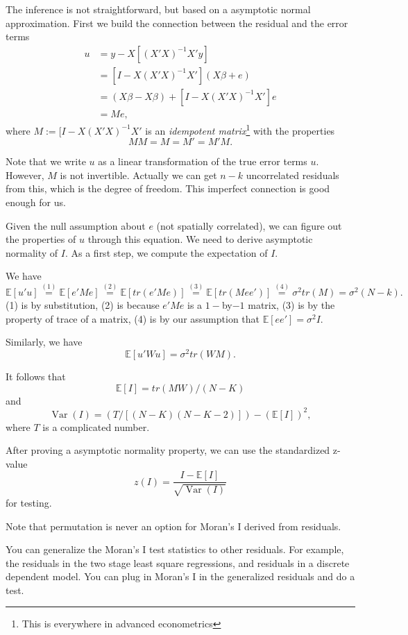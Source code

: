 \documentclass[11pt,a4paper]{amsart}
\theoremstyle{plain}
\theoremstyle{definition}
\begin{document}
The inference is not straightforward, but based on a asymptotic normal approximation. First we build the connection between the residual and the error terms
\[	\begin{aligned}
	u &= y - X[(X'X)^{-1}X'y] \\
	&= [I - X(X'X)^{-1}X'](X\beta + e)\\
	&= (X\beta - X\beta) + [I - X(X'X)^{-1}X']e\\
	&= Me,
 \end{aligned}	\]
where $M := [I - X(X'X)^{-1}X'$ is an \textit{idempotent matrix}\footnote{This is everywhere in advanced econometrics} with the properties 
\[MM = M = M' = M'M. \]

Note that we write $u$ as a linear transformation of the true error terms $u$. However, $M$ is not invertible. Actually we can get $n-k$ uncorrelated residuals from this, which is the degree of freedom. This imperfect connection is good enough for us. 

Given the null assumption about $e$ (not spatially correlated), we can figure out the properties of $u$ through this equation. We need to derive asymptotic normality of $I$. As a first step, we compute the expectation of $I$.

We have 
\[	\mathbb{E}[u'u]  \stackrel{(1)}{=} \mathbb{E}[e'Me] \stackrel{(2)}{=} \mathbb{E}[tr(e'Me)]  \stackrel{(3)}{=} \mathbb{E}[tr(Mee')]  \stackrel{(4)}{=} \sigma^{2}tr(M)  = \sigma^{2}(N-k).	\]
(1) is by substitution, (2) is because $e'Me$ is a $1-$by$-1$ matrix, (3) is by the property of trace of a matrix, (4) is by our assumption that $\mathbb{E}[ee'] = \sigma^{2}I$.

Similarly, we have 
\[	\mathbb{E}[u'Wu] = \sigma^{2} tr(WM). 	\]

It follows that 
\[	\mathbb{E}[I] = tr(MW) / (N-K)	\]
and 
\[ \operatorname{Var}(I) = (T / [(N-K)(N-K-2)]) - (\mathbb{E}[I])^{2},	\]
where $T$ is a complicated number.

After proving a asymptotic normality property, we can use the standardized z-value 
\[	z(I) = \frac{I-\mathbb{E}[I]}{\sqrt{\operatorname{Var}(I)}}	\]
 for testing.
 
 Note that permutation is never an option for Moran's I derived from residuals. 
 
 You can generalize the Moran's I test statistics to other residuals. For example, the residuals in the two stage least square regressions, and residuals in a discrete dependent model. You can plug in Moran's I in the generalized residuals and do a test.
 
\end{document}
